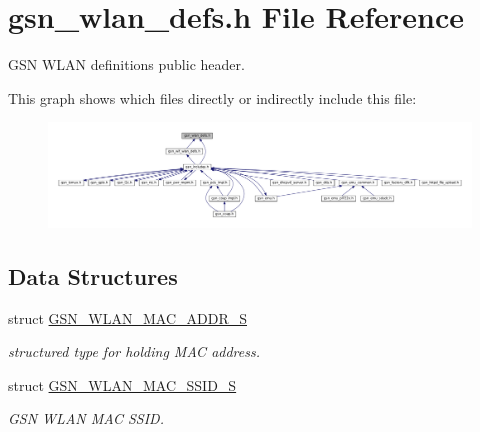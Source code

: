 \hypertarget{a00614}{
\section{gsn\_\-wlan\_\-defs.h File Reference}
\label{a00614}
}


GSN WLAN definitions public header.  


This graph shows which files directly or indirectly include this file:
\nopagebreak
\begin{figure}[H]
\begin{center}
\leavevmode
\includegraphics[width=400pt]{a00862}
\end{center}
\end{figure}
\subsection*{Data Structures}
\begin{DoxyCompactItemize}
\item 
struct \hyperlink{a00416}{GSN\_\-WLAN\_\-MAC\_\-ADDR\_\-S}
\begin{DoxyCompactList}\small\item\em structured type for holding MAC address. \end{DoxyCompactList}\item 
struct \hyperlink{a00417}{GSN\_\-WLAN\_\-MAC\_\-SSID\_\-S}
\begin{DoxyCompactList}\small\item\em GSN WLAN MAC SSID. \end{DoxyCompactList}\end{DoxyCompactItemize}
